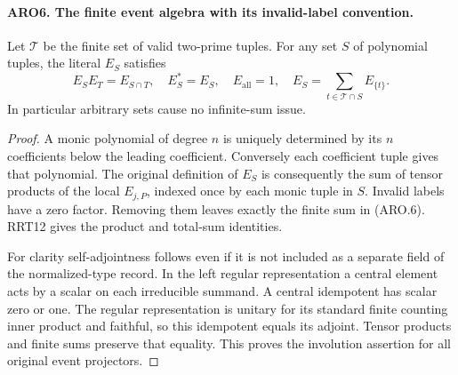 \paragraph{ARO6. The finite event algebra with its invalid-label convention.}
\label{claim:ARO6}
Let \(\mathcal T\) be the finite set of valid two-prime tuples.
For any set \(S\) of polynomial tuples, the literal \(E_S\) satisfies
\[
 E_SE_T=E_{S\cap T},\quad E_S^*=E_S,\quad E_{\mathrm{all}}=1,
 \quad E_S=\sum_{t\in\mathcal T\cap S}E_{\{t\}}.
 \tag{ARO.6}
\]
In particular arbitrary sets cause no infinite-sum issue.
\begin{proof}
A monic polynomial of degree \(n\) is uniquely determined by its
\(n\) coefficients below the leading coefficient.  Conversely each
coefficient tuple gives that polynomial.  The original definition of
\(E_S\) is consequently the sum of tensor products of the local
\(E_{j,P}\), indexed once by each monic tuple in \(S\).  Invalid
labels have a zero factor.  Removing them leaves exactly the finite
sum in (ARO.6).  RRT12 gives the product and total-sum identities.

For clarity self-adjointness follows even if it is not included as
a separate field of the normalized-type record.  In the left regular
representation a central element acts by a scalar on each irreducible
summand.  A central idempotent has scalar zero or one.  The regular
representation is unitary for its standard finite counting inner
product and faithful, so this idempotent equals its adjoint.
Tensor products and finite sums preserve that equality.  This proves
the involution assertion for all original event projectors.
\end{proof}

